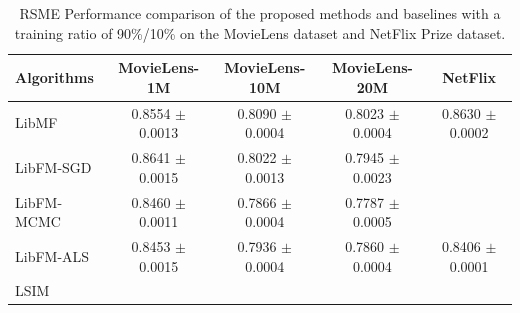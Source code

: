 \documentclass{sig-alternate-05-2015}
\begin{document}




\begin{table}[htpb]
	\centering
	\caption{RSME Performance comparison of the proposed methods and baselines with a training ratio of 90\%/10\%
    on the MovieLens dataset and NetFlix Prize dataset.}
	\label{tab:msre}
	\begin{tabular}{|l|c|c|c|c|}
		\hline
		\textbf{Algorithms} & \textbf{MovieLens-1M} & \textbf{MovieLens-10M} & \textbf{MovieLens-20M}  & \textbf{NetFlix} \\
		\hline
		LibMF      & 0.8554 $\pm$ 0.0013 & 0.8090 $\pm$ 0.0004 & 0.8023 $\pm$ 0.0004 & 0.8630 $\pm$ 0.0002 \\
		LibFM-SGD  & 0.8641 $\pm$ 0.0015 & 0.8022 $\pm$ 0.0013 & 0.7945 $\pm$ 0.0023 & \\
		LibFM-MCMC & 0.8460 $\pm$ 0.0011 & 0.7866 $\pm$ 0.0004 & 0.7787 $\pm$ 0.0005 & \\
		LibFM-ALS  & 0.8453 $\pm$ 0.0015 & 0.7936 $\pm$ 0.0004 & 0.7860 $\pm$ 0.0004 & 0.8406 $\pm$ 0.0001 \\
		LSIM       &  &  &  & \\
		\hline
	\end{tabular}
\end{table}
\end{document}
